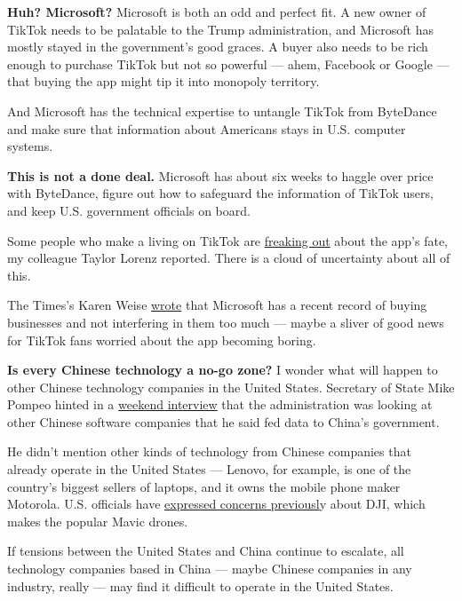 \textbf{Huh? Microsoft?} Microsoft is both an odd and perfect fit. A new
owner of TikTok needs to be palatable to the Trump administration, and
Microsoft has mostly stayed in the government's good graces. A buyer
also needs to be rich enough to purchase TikTok but not so powerful ---
ahem, Facebook or Google --- that buying the app might tip it into
monopoly territory.

And Microsoft has the technical expertise to untangle TikTok from
ByteDance and make sure that information about Americans stays in U.S.
computer systems.

\textbf{This is not a done deal.} Microsoft has about six weeks to
haggle over price with ByteDance, figure out how to safeguard the
information of TikTok users, and keep U.S. government officials on
board.

Some people who make a living on TikTok are
\href{https://www.nytimes.com/2020/08/02/style/tiktok-ban-threat-trump.html}{freaking
out} about the app's fate, my colleague Taylor Lorenz reported. There is
a cloud of uncertainty about all of this.

The Times's Karen Weise
\href{https://www.nytimes.com/2020/08/03/technology/tiktok-microsoft-tweens.html}{wrote}
that Microsoft has a recent record of buying businesses and not
interfering in them too much --- maybe a sliver of good news for TikTok
fans worried about the app becoming boring.

\textbf{Is every Chinese technology a no-go zone?} I wonder what will
happen to other Chinese technology companies in the United States.
Secretary of State Mike Pompeo hinted in a
\href{https://www.state.gov/secretary-michael-r-pompeo-with-maria-bartiromo-of-fox-news-sunday-morning-futures-2/}{weekend
interview} that the administration was looking at other Chinese software
companies that he said fed data to China's government.

He didn't mention other kinds of technology from Chinese companies that
already operate in the United States --- Lenovo, for example, is one of
the country's biggest sellers of laptops, and it owns the mobile phone
maker Motorola. U.S. officials have
\href{https://www.nytimes.com/2020/07/23/us/politics/dji-drones-security-vulnerability.html}{expressed
concerns previousl}y about DJI, which makes the popular Mavic drones.

If tensions between the United States and China continue to escalate,
all technology companies based in China --- maybe Chinese companies in
any industry, really --- may find it difficult to operate in the United
States.

